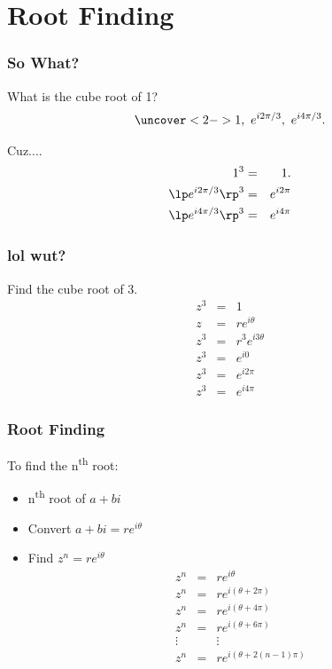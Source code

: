 \section{Root Finding}

\begin{frame}
  \frametitle{So What?}

  What is the cube root of 1?
  \begin{eqnarray*}
    \uncover<2->{1,~e^{i2\pi/3},~e^{i4\pi/3}}.
  \end{eqnarray*}

  {
    Cuz....
    \begin{eqnarray*}
      1^3 & = & 1. \\
      \lp e^{i2\pi/3} \rp^3 & = &  e^{i2\pi} \\
      \lp e^{i4\pi/3} \rp^3 & = & e^{i4\pi}
    \end{eqnarray*}

  }

  
\end{frame}

\begin{frame}
  \frametitle{lol wut?}

  Find the cube root of 3.
  \begin{eqnarray*}
    z^3 & = & 1 \\
    z & = & r e^{i\theta} \\
    z^3 & = & r^3 e^{i3\theta} \\
    z^3 & = & e^{i0} \\
    z^3 & = & e^{i2\pi} \\
    z^3 & = & e^{i4\pi}
  \end{eqnarray*}
  
\end{frame}

\begin{frame}
  \frametitle{Root Finding}
  To find the n\textsuperscript{th} root:
  \begin{itemize}
  \item n\textsuperscript{th} root of $a+bi$
  \item Convert $a+bi=re^{i\theta}$ 
  \item Find $z^n=re^{i\theta}$
    \begin{eqnarray*}
      z^n & = & re^{i\theta} \\
      z^n & = & re^{i(\theta+2\pi)} \\
      z^n & = & re^{i(\theta+4\pi)} \\
      z^n & = & re^{i(\theta+6\pi)} \\
      \vdots & & \vdots \\
      z^n & = & re^{i(\theta+2(n-1)\pi)} \\
    \end{eqnarray*}
  \end{itemize}
\end{frame}

